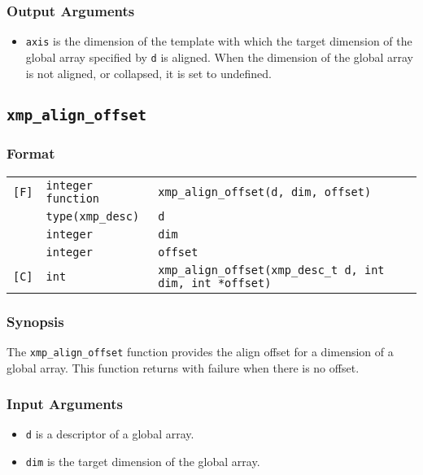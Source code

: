 \subsubsection*{Output Arguments}
\begin{itemize}
 \item {\tt axis} is the dimension of the template with which the target
       dimension of the global array specified by {\tt d} is
       aligned. When the dimension of the global array is not aligned,
       or collapsed, it is set to undefined.
\end{itemize}


\subsection{\tt xmp\_align\_offset}

\subsubsection*{Format}

\begin{tabular}{lll}

\verb![F]!& {\tt integer function}& {\tt xmp\_align\_offset(d, dim, offset)}\\
          & {\tt type(xmp\_desc)} & {\tt d}\\
          & {\tt integer} & {\tt dim}\\
          & {\tt integer} & {\tt offset}\\

\verb![C]!&  {\tt int}& {\tt xmp\_align\_offset(xmp\_desc\_t d, int dim, int *offset)}\\

\end{tabular}

\subsubsection*{Synopsis}

The {\tt xmp\_align\_offset} function provides the align offset for a
dimension of a global array. This function returns with failure when
there is no offset.

\subsubsection*{Input Arguments}
\begin{itemize}
 \item {\tt d} is a descriptor of a global array.
 \item {\tt dim} is the target dimension of the global array.
\end{itemize}

